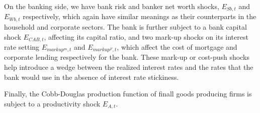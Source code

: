 \documentclass[12pt]{article}
\numberwithin{equation}{section}
\begin{document}
On the banking side, we have bank risk and banker net worth shocks, $E_{Sb,t}$ and $E_{Wb,t}$ respectively, which again have similar meanings as their counterparts in the household and corporate sectors. The bank is further subject to a bank capital shock $E_{CAB,t}$, affecting its capital ratio, and two mark-up shocks on its interest rate setting $E_{markup^m,t}$ and $E_{markup^F,t}$, which affect the cost of mortgage and corporate lending respectively for the bank. These mark-up or cost-push shocks help introduce a wedge between the realized interest rates and the rates that the bank would use in the absence of interest rate stickiness. 

Finally, the Cobb-Douglas production function of finall goods producing firms is subject to a productivity shock $E_{A,t}$. 


\end{document}
